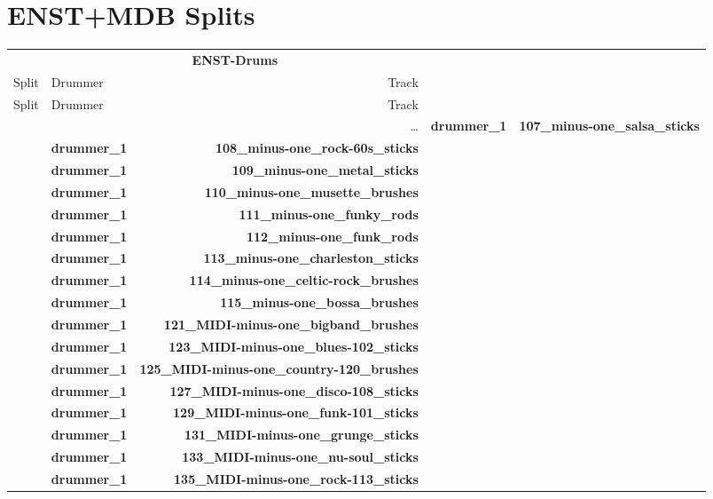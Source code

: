 \chapter{ENST+MDB Splits}\label{appendix-a}

\begin{tabularx}{\linewidth}{l|lrX}
    & \multicolumn{2}{c}{\textbf{ENST-Drums}} \\
    Split & Drummer & Track \\
    \hline
    \endfirsthead
    Split & Drummer & Track \\
    \hline
    \endhead
    \multicolumn{3}{r}{\footnotesize\dots}
    \endfoot
    \endlastfoot
    Train & \textbf{drummer\_1} & \textbf{107\_minus-one\_salsa\_sticks} \\
        & \textbf{drummer\_1} & \textbf{108\_minus-one\_rock-60s\_sticks} \\
        & \textbf{drummer\_1} & \textbf{109\_minus-one\_metal\_sticks} \\
        & \textbf{drummer\_1} & \textbf{110\_minus-one\_musette\_brushes} \\
        & \textbf{drummer\_1} & \textbf{111\_minus-one\_funky\_rods} \\
        & \textbf{drummer\_1} & \textbf{112\_minus-one\_funk\_rods} \\
        & \textbf{drummer\_1} & \textbf{113\_minus-one\_charleston\_sticks} \\
        & \textbf{drummer\_1} & \textbf{114\_minus-one\_celtic-rock\_brushes} \\
        & \textbf{drummer\_1} & \textbf{115\_minus-one\_bossa\_brushes} \\
        & \textbf{drummer\_1} & \textbf{121\_MIDI-minus-one\_bigband\_brushes} \\
        & \textbf{drummer\_1} & \textbf{123\_MIDI-minus-one\_blues-102\_sticks} \\
        & \textbf{drummer\_1} & \textbf{125\_MIDI-minus-one\_country-120\_brushes} \\
        & \textbf{drummer\_1} & \textbf{127\_MIDI-minus-one\_disco-108\_sticks} \\
        & \textbf{drummer\_1} & \textbf{129\_MIDI-minus-one\_funk-101\_sticks} \\
        & \textbf{drummer\_1} & \textbf{131\_MIDI-minus-one\_grunge\_sticks} \\
        & \textbf{drummer\_1} & \textbf{133\_MIDI-minus-one\_nu-soul\_sticks} \\
        & \textbf{drummer\_1} & \textbf{135\_MIDI-minus-one\_rock-113\_sticks} \\

\end{tabularx}
